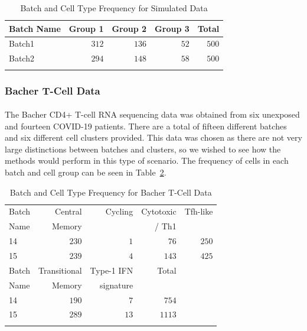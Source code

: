 \documentclass[unnumsec,webpdf,contemporary,large]{oup-authoring-template}%
\theoremstyle{thmstyleone}%
\theoremstyle{thmstyletwo}%
\theoremstyle{thmstylethree}%
\begin{document}
\begin{table}[ht]
        \caption{Batch and Cell Type Frequency for Simulated Data}
        \centering
        \begin{tabular}{lrrrr}
        \toprule
        Batch Name & Group 1 & Group 2 & Group 3 & Total \\
        \midrule
        Batch1 & $312$ & $136$ & $52$ & $500$ \\
        Batch2 & $294$ & $148$ & $58$ & $500$ \\
        \botrule
        \end{tabular}
        \label{tab:freq_simdata}
\end{table}

\subsubsection*{Bacher T-Cell Data}

\paragraph*{}
The Bacher CD4+ T-cell RNA sequencing data \citep{bacher2020low} was obtained from six unexposed and fourteen COVID-19 patients. There are a total of fifteen different batches and six different cell clusters provided. This data was chosen as there are not very large distinctions between batches and clusters, so we wished to see how the methods would perform in this type of scenario. The frequency of cells in each batch and cell group can be seen in Table~\ref{tab:freq_bacher}.

\begin{table}[ht]
    \caption{Batch and Cell Type Frequency for Bacher T-Cell Data}
    \centering
    \begin{tabular}{lrrrr}
    \toprule
    Batch & Central  & Cycling & Cytotoxic & Tfh-like \\
    Name  & Memory   &         &  / Th1    &          \\
    \midrule
    14    & $230$    & $1$     &  $76$     & $250$    \\
    15    & $239$    & $4$     & $143$     & $425$    \\
    \midrule
    Batch &  Transitional & Type-1 IFN  & Total \\
    Name  &  Memory       & signature   &       \\
    \midrule
    14    &  $190$        &  $7$        &  $754$ \\
    15    &  $289$        & $13$        & $1113$ \\
    \botrule
    \end{tabular}
    \label{tab:freq_bacher}
\end{table}
\end{document}
